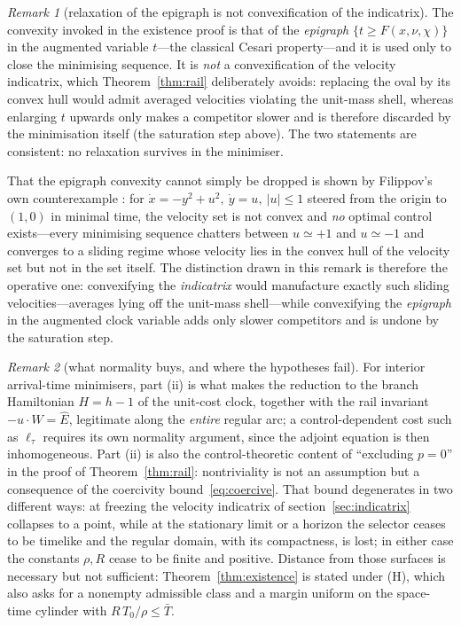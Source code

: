 \documentclass[12pt]{iopart}
\newcommand{\Ehat}{\hat E}
\theoremstyle{plain}
\theoremstyle{definition}
\theoremstyle{plain}
\theoremstyle{remark}
\newtheorem*{remark}{Remark}
\begin{document}
\begin{remark}[relaxation of the epigraph is not convexification of the indicatrix]
\label{rem:no-convexification}
The convexity invoked in the existence proof is that of the \emph{epigraph}
$\{t\ge F(x,\nu,\chi)\}$ in the augmented variable $t$---the classical Cesari property---and
it is used only to close the minimising sequence. It is \emph{not} a convexification of the
velocity indicatrix, which Theorem~\ref{thm:rail} deliberately avoids: replacing the oval
by its convex hull would admit averaged velocities violating the unit-mass shell, whereas
enlarging $t$ upwards only makes a competitor slower and is therefore discarded by the
minimisation itself (the saturation step above). The two statements are consistent: no
relaxation survives in the minimiser.

That the epigraph convexity cannot simply be dropped is shown by Filippov's own
counterexample \cite[\S V]{Filippov1962}: for
$\dot x=-y^2+u^2,\ \dot y=u,\ |u|\le1$ steered from the origin to $(1,0)$ in minimal
time, the velocity set is not convex and \emph{no} optimal control exists---every
minimising sequence chatters between $u\simeq+1$ and $u\simeq-1$ and converges to a
sliding regime whose velocity lies in the convex hull of the velocity set but not in
the set itself. The distinction drawn in this remark is therefore the operative one:
convexifying the \emph{indicatrix} would manufacture exactly such sliding
velocities---averages lying off the unit-mass shell---while convexifying
the \emph{epigraph} in the augmented clock variable adds only slower competitors and
is undone by the saturation step.
\end{remark}

\begin{remark}[what normality buys, and where the hypotheses fail]
For interior arrival-time minimisers, part (ii) is what makes the reduction to the
branch Hamiltonian $H=h-1$ of the unit-cost clock, together with the rail invariant
$-u\cdot W=\Ehat$, legitimate along the \emph{entire} regular arc; a control-dependent
cost such as $\ell_\tau$ requires its own normality argument, since the adjoint equation
is then inhomogeneous. Part (ii) is also the control-theoretic content of
``excluding $p=0$'' in the proof of Theorem~\ref{thm:rail}: nontriviality is not an
assumption but a consequence of the coercivity bound~\eqref{eq:coercive}. That bound
degenerates in two different ways: at freezing the velocity indicatrix of
section~\ref{sec:indicatrix} collapses to a point, while at the stationary limit or a
horizon the selector ceases to be timelike and the regular domain, with its compactness,
is lost; in either case the constants $\rho,R$ cease to be finite and positive. Distance
from those surfaces is necessary but not sufficient:
Theorem~\ref{thm:existence} is stated under (H), which also asks for a nonempty admissible
class and a margin uniform on the space-time cylinder with $R\,T_0/\rho\le\bar T$.
\end{remark}
\end{document}
